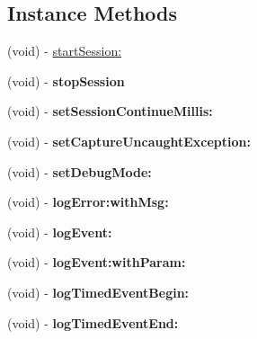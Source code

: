 \subsection*{Instance Methods}
\begin{DoxyCompactItemize}
\item 
(void) -\/ \hyperlink{interfaceAnalyticsUmeng_ab7da204f27cd3c7879daa9f25af7de64}{start\+Session\+:}
\item 
\mbox{\label{interfaceAnalyticsUmeng_aebc43e8555cfc4d3faad8a1856505c1b}} 
(void) -\/ {\bfseries stop\+Session}
\item 
\mbox{\label{interfaceAnalyticsUmeng_ac9f816a075c6c9aa7246785c2fde44fc}} 
(void) -\/ {\bfseries set\+Session\+Continue\+Millis\+:}
\item 
\mbox{\label{interfaceAnalyticsUmeng_acf12c719dcdf111d9e6178b621d55296}} 
(void) -\/ {\bfseries set\+Capture\+Uncaught\+Exception\+:}
\item 
\mbox{\label{interfaceAnalyticsUmeng_ae2289d4c556504fd80a3f0956cda1594}} 
(void) -\/ {\bfseries set\+Debug\+Mode\+:}
\item 
\mbox{\label{interfaceAnalyticsUmeng_a234b0b0aa85a093cafac875944e852a7}} 
(void) -\/ {\bfseries log\+Error\+:with\+Msg\+:}
\item 
\mbox{\label{interfaceAnalyticsUmeng_a842d2af0c6b168a64f524b3da392517f}} 
(void) -\/ {\bfseries log\+Event\+:}
\item 
\mbox{\label{interfaceAnalyticsUmeng_a41655ed94eb3d5318b5041dda16dcd65}} 
(void) -\/ {\bfseries log\+Event\+:with\+Param\+:}
\item 
\mbox{\label{interfaceAnalyticsUmeng_a2d5ce944b509a1e31db310fd54f3f60d}} 
(void) -\/ {\bfseries log\+Timed\+Event\+Begin\+:}
\item 
\mbox{\label{interfaceAnalyticsUmeng_ac46e185512226db073fab8c6a63114ea}} 
(void) -\/ {\bfseries log\+Timed\+Event\+End\+:}
\item 

\end{DoxyCompactItemize}
